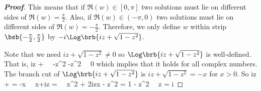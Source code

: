 \begin{proof}[\bf Proof]
%
%
%
%
%

This means that if $\Re(w)\in [0,\pi]$ two solutions must lie on different sides of $\Re(w) = \frac{\pi}2$. Also, if $\Re(w)\in (-\pi,0)$ two solutions must lie on different sides of $\Re(w) = -\frac{\pi}2$. Therefore, we only define $w$ within strip $\bsb{-\frac{\pi}2,\frac{\pi}2}$ by $-i\Log\brb{iz + \sqrt{1-z^2}}$.

Note that we need $iz + \sqrt{1-z^2}\neq 0$ so $\Log\brb{iz + \sqrt{1-z^2}}$ is well-defined. That is,
\be
iz +   \ \ra\ -z^2 -z^2 \ \ra\ 0 
\ee
which implies that it holds for all complex numbers. The branch cut of $\Log\brb{iz + \sqrt{1-z^2}}$ is $iz + \sqrt{1-z^2} = -x$ for $x>0$. So
\be
iz +  = -x \ \ra\ x+iz =  \ \ra\ x^2 + 2izx - z^2 = 1 - z^2 \ \ra\ z = i
\ee


\end{proof}
